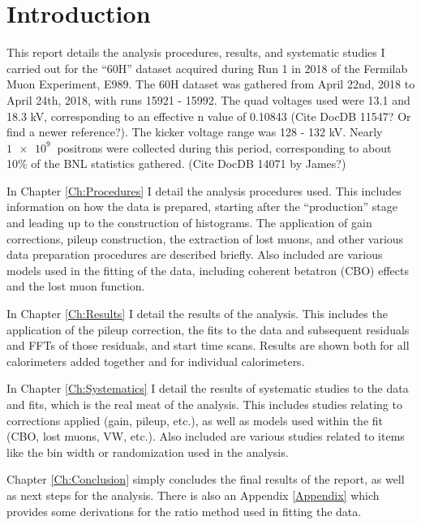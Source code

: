 \chapter{Introduction}
\label{Ch:Introduction}

This report details the analysis procedures, results, and systematic studies I carried out for the ``60H'' dataset acquired during Run 1 in 2018 of the Fermilab Muon \gmtwo Experiment, E989. The 60H dataset was gathered from April 22nd, 2018 to April 24th, 2018, with runs 15921 - 15992. The quad voltages used were 13.1 and 18.3 kV, corresponding to an effective n value of 0.10843 (Cite DocDB 11547? Or find a newer reference?). The kicker voltage range was 128 - 132 kV. Nearly $\SI{1e9}{}$ positrons were collected during this period, corresponding to about 10\% of the BNL statistics gathered. (Cite DocDB 14071 by James?)

In Chapter \ref{Ch:Procedures} I detail the analysis procedures used. This includes information on how the data is prepared, starting after the ``production'' stage and leading up to the construction of histograms. The application of gain corrections, pileup construction, the extraction of lost muons, and other various data preparation procedures are described briefly. Also included are various models used in the fitting of the data, including coherent betatron (CBO) effects and the lost muon function.

In Chapter \ref{Ch:Results} I detail the results of the analysis. This includes the application of the pileup correction, the fits to the data and subsequent residuals and FFTs of those residuals, and start time scans. Results are shown both for all calorimeters added together and for individual calorimeters.

In Chapter \ref{Ch:Systematics} I detail the results of systematic studies to the data and fits, which is the real meat of the analysis. This includes studies relating to corrections applied (gain, pileup, etc.), as well as models used within the fit (CBO, lost muons, VW, etc.). Also included are various studies related to items like the bin width or randomization used in the analysis.

Chapter \ref{Ch:Conclusion} simply concludes the final results of the report, as well as next steps for the analysis. There is also an Appendix \ref{Appendix} which provides some derivations for the ratio method used in fitting the data.

